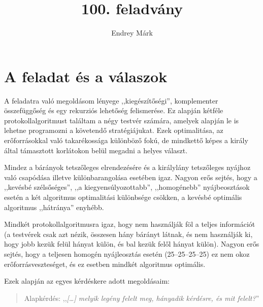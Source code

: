 \documentclass{article}
\title{100. feladvány}
\author{Endrey Márk}
\begin{document}
	\maketitle

	\tableofcontents

	\section{A feladat és a válaszok}

	A feladatra való megoldásom lényege ,,kiegészítőségi'', komplementer összefüggőség és egy rekurziós lehetőség felismerése. Ez alapján kétféle protokollalgoritmust találtam a négy testvér számára, amelyek alapján le is lehetne programozni a követendő stratégiájukat.
	Ezek optimalitása, az erőforrásokkal való takarékossága különböző fokú, de mindkettő képes a király által támasztott korlátokon belül megadni a helyes választ.

	Mindez a bárányok tetszőleges elrendezésére és a királylány tetszőleges nyájhoz való csapódása illetve különbarangolása esetében igaz.
	Nagyon erős sejtés, hogy a ,,kevésbé szélsőséges'', ,,a kiegyensúlyozottabb'', ,,homogénebb'' nyájbeosztások esetén a két algoritmus optimalitási különbsége csökken, a kevésbé optimális algoritmus ,,hátránya'' enyhébb.

	Mindkét protokollalgoritmusra igaz, hogy nem használják föl a teljes információt (a testvérek csak azt nézik, összesen hány bárányt látnak, és nem használják ki, hogy jobb kezük felül hányat külön, és bal kezük felől hányat külön). Nagyon erős sejtés, hogy a teljesen homogén nyájleosztás esetén (25--25--25--25) ez nem okoz erőforrásveszteséget, és ez esetben mindkét algoritmus optimális.

	Ezek alapján az egyes  kérdéskere adott megoldásaim:

	\begin{quotation}
		Alapkérdés: ,,\textit{[\dots] melyik legény felelt meg, hányadik kérdésre, és mit felelt?}''
	\end{quotation}
\end{document}
